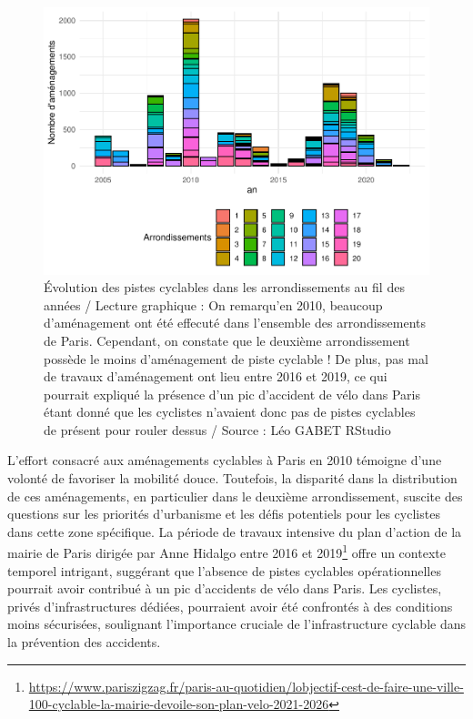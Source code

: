 \documentclass[french,]{compterendu}
\let\rmarkdownfootnote\footnote%
\def\footnote{\protect\rmarkdownfootnote}
\theoremstyle{urcastyle}
\theoremstyle{remark}
\begin{document}
\begin{figure}[H]

{\centering \includegraphics[width=0.9\linewidth]{Rapport_ADD_LEO-GABET_files/figure-latex/arrPARISdetails-1} 

}

\caption{Évolution des pistes cyclables dans les arrondissements au fil des années / Lecture graphique : On remarqu'en 2010, beaucoup d'aménagement ont été effecuté dans l'ensemble des arrondissements de Paris. Cependant, on constate que le deuxième arrondissement possède le moins d'aménagement de piste cyclable ! De plus, pas mal de travaux d'aménagement ont lieu entre 2016 et 2019, ce qui pourrait expliqué la présence d'un pic d'accident de vélo dans Paris étant donné que les cyclistes n'avaient donc pas de pistes cyclables de présent pour rouler dessus / Source : Léo GABET RStudio}\label{fig:arrPARISdetails}
\end{figure}

L'effort consacré aux aménagements cyclables à Paris en 2010 témoigne d'une volonté de favoriser la mobilité douce. Toutefois, la disparité dans la distribution de ces aménagements, en particulier dans le deuxième arrondissement, suscite des questions sur les priorités d'urbanisme et les défis potentiels pour les cyclistes dans cette zone spécifique.
La période de travaux intensive du plan d'action de la mairie de Paris dirigée par Anne Hidalgo entre 2016 et 2019\footnote{\url{https://www.pariszigzag.fr/paris-au-quotidien/lobjectif-cest-de-faire-une-ville-100-cyclable-la-mairie-devoile-son-plan-velo-2021-2026}} offre un contexte temporel intrigant, suggérant que l'absence de pistes cyclables opérationnelles pourrait avoir contribué à un pic d'accidents de vélo dans Paris. Les cyclistes, privés d'infrastructures dédiées, pourraient avoir été confrontés à des conditions moins sécurisées, soulignant l'importance cruciale de l'infrastructure cyclable dans la prévention des accidents.
\end{document}
